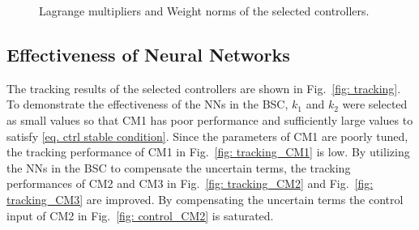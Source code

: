 \documentclass[lettersize,journal]{IEEEtran}
\begin{document}
\begin{figure}[!t]
    \centering
    \qquad
    \vfill
    \qquad
    \caption{Lagrange multipliers and Weight norms of the selected controllers.}
    \label{fig: weight and multiplier}
\end{figure}

\subsection{Effectiveness of Neural Networks}

The tracking results of the selected controllers are shown in Fig.~\ref{fig: tracking}.
To demonstrate the effectiveness of the NNs in the BSC, $k_1$ and $k_2$ were selected as small values so that CM1 has poor performance and sufficiently large values to satisfy \eqref{eq. ctrl stable condition}.
Since the parameters of CM1 are poorly tuned, the tracking performance of CM1 in Fig.~\ref{fig: tracking_CM1} is low.
By utilizing the NNs in the BSC to compensate the uncertain terms, the tracking performances of CM2 and CM3 in Fig.~\ref{fig: tracking_CM2} and Fig.~\ref{fig: tracking_CM3} are improved.
By compensating the uncertain terms the control input of CM2 in Fig.~\ref{fig: control_CM2} is saturated.
\end{document}
